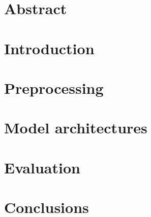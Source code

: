 \documentclass[10pt]{article}
\begin{document}
\begin{titlepage}
\vfill %

\end{titlepage}

\tableofcontents          %
\listoffigures
\listoftables
\newpage
\section{Abstract}


\section{Introduction}


\section{Preprocessing}


\section{Model architectures}


\section{Evaluation} \label{evaluation}



\section{Conclusions}




\begin{appendices}\label{app}

\end{appendices}
\end{document}
